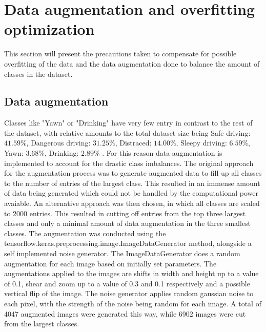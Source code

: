 \section{Data augmentation and overfitting optimization}
    \label{sec:2}
This section will present the precautions taken to compensate for possible overfitting of the data and the data augmentation done to balance the amount of classes in the dataset.
\subsection{Data augmentation}
Classes like "Yawn" or "Drinking" have very few entry in contrast to the rest of the dataset, with relative amounts to the total dataset size being 
Safe driving: $41.59\%$,
Dangerous driving: $31.25\%$,
Distraced: $14.00\%$,
Sleepy driving: $6.59\%$,
Yawn: $3.68\%$,
Drinking: $2.89\%$ .
For this reason data augmentation is implemented to account for the drastic class imbalances.
The original approach for the augmentation process was to generate augmented data to fill up all classes to the number of entries of the largest class. This resulted in an immense amount of data being generated which could not be handled by the computational power avaiable. An alternative approach was then chosen, in which all classes are scaled to 2000 entries. This resulted in cutting off entries from the top three largest classes and only a minimal amount of data augmentation in the three smallest classes. 
The augmentation was conducted using the tensorflow.keras.preprocessing.image.ImageDataGenerator method, alongside a self implemented noise generator. The ImageDataGenerator does a random augmentation for each image based on initially set parameters. The augmentations applied to the images are shifts in width and height up to a value of 0.1, shear and zoom up to a value of 0.3 and 0.1 respectively and a possible vertical flip of the image. The noise generator applies random gaussian noise to each pixel, with the strength of the noise being random for each image. A total of 4047 augmented images were generated this way, while 6902 images were cut from the largest classes. 
